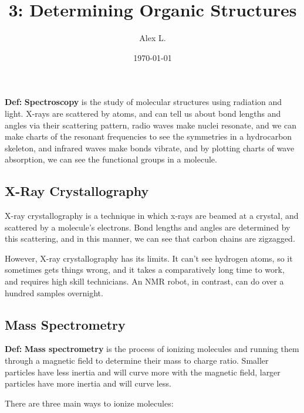 \documentclass{article}
\title{3: Determining Organic Structures}
\author{Alex L.}
\date{\today}
\begin{document}
\maketitle

\textbf{Def:} \textbf{Spectroscopy} is the study of molecular structures using radiation and light. X-rays are scattered by atoms, and can tell us about bond lengths and angles via their scattering pattern, radio waves make nuclei resonate, and we can make charts of the resonant frequencies to see the symmetries in a hydrocarbon skeleton, and infrared waves make bonds vibrate, and by plotting charts of wave absorption, we can see the functional groups in a molecule. 

\subsection{X-Ray Crystallography}

X-ray crystallography is a technique in which x-rays are beamed at a crystal, and scattered by a molecule's electrons. Bond lengths and angles are determined by this scattering, and in this manner, we can see that carbon chains are zigzagged.

However, X-ray crystallography has its limits. It can't see hydrogen atoms, so it sometimes gets things wrong, and it takes a comparatively long time to work, and requires high skill technicians. An NMR robot, in contrast, can do over a hundred samples overnight. 

\subsection{Mass Spectrometry}

\textbf{Def:} \textbf{Mass spectrometry} is the process of ionizing molecules and running them through a magnetic field to determine their mass to charge ratio. Smaller particles have less inertia and will curve more with the magnetic field, larger particles have more inertia and will curve less. 

There are three main ways to ionize molecules:
\end{document}
